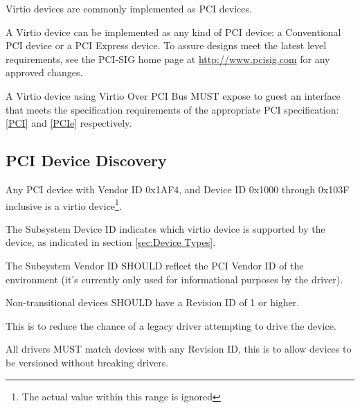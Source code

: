Virtio devices are commonly implemented as PCI devices.

A Virtio device can be implemented as any kind of PCI device:
a Conventional PCI device or a PCI Express
device.  To assure designs meet the latest level
requirements, see 
the PCI-SIG home page at \url{http://www.pcisig.com} for any
approved changes.

A Virtio device using Virtio Over PCI Bus MUST expose to
guest an interface that meets the specification requirements of
the appropriate PCI specification: \hyperref[intro:PCI]{[PCI]}
and \hyperref[intro:PCIe]{[PCIe]}
respectively. 

\subsection{PCI Device Discovery}\label{sec:Virtio Transport Options / Virtio Over PCI Bus / PCI Device Discovery}

Any PCI device with Vendor ID 0x1AF4, and Device ID 0x1000 through
0x103F inclusive is a virtio device\footnote{The actual value within this range is ignored
}.

The Subsystem Device ID indicates which virtio device is
supported by the device, as indicated in section \ref{sec:Device Types}.

The Subsystem Vendor ID SHOULD reflect
the PCI Vendor ID of the environment (it's currently only used
for informational purposes by the driver).

Non-transitional devices SHOULD have a Revision ID of 1 or higher.

This is to reduce the chance of a legacy driver attempting
to drive the device.

All drivers MUST match devices with any Revision ID, this
is to allow devices to be versioned without breaking drivers.


